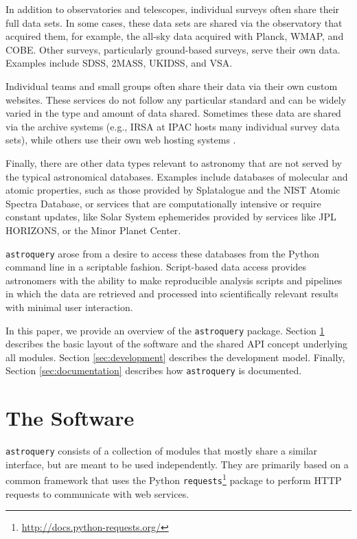 \documentclass[twocolumn]{aastex62}
\newcommand{\package}[1]{\texttt{#1}\xspace}
\newcommand{\astroquery}{\package{astroquery}}
\begin{document}
In addition to observatories and telescopes, individual surveys often share
their full data sets.  In some cases, these data sets are shared via the
observatory that acquired them, for example, the all-sky data acquired with
Planck, WMAP, and COBE\@.  Other surveys, particularly ground-based surveys,
serve their own data.  Examples include SDSS, 2MASS, UKIDSS, and VSA.


Individual teams and small groups often share their data via their own
custom websites.  These services do not follow any particular standard and can
be widely varied in the type and amount of data shared.  Sometimes these data
are shared via the archive systems (e.g., IRSA at IPAC hosts many individual
survey data sets), while others use their own web hosting systems \citep[e.g.,
MAGPIS;][]{Helfand2006}.

Finally, there are other data types relevant to astronomy that are not
served by the typical astronomical databases.  Examples include databases of
molecular and atomic properties, such as those provided by Splatalogue and
the NIST Atomic Spectra Database, or services that are computationally
intensive or require constant updates, like Solar System ephemerides
provided by services like JPL HORIZONS, or the Minor Planet Center.

\astroquery arose from a desire to access these databases from the Python
command line in a scriptable fashion.  Script-based data access provides
astronomers with the ability to make reproducible analysis scripts and
pipelines in which the data are retrieved and processed into scientifically
relevant results with minimal user interaction.

In this paper, we provide an overview of the \astroquery package.  Section
\ref{sec:software} describes the basic layout of the software and the shared
API concept underlying all modules.  Section \ref{sec:development} describes
the development model.  Finally, Section \ref{sec:documentation} describes how
\astroquery is documented.



\section{The Software}
\label{sec:software}
\astroquery consists of a collection of modules that mostly share a similar
interface, but are meant to be used independently.  They are primarily based on
a common framework that uses the Python
\package{requests}\footnote{\url{http://docs.python-requests.org/}} package to
perform HTTP requests to communicate with web services.
\end{document}
